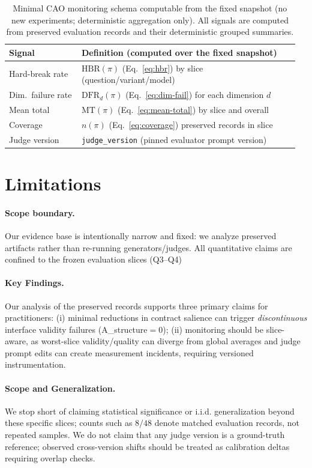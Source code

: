 \documentclass{article}
\newcommand{\Astruct}{A\_structure}
\begin{document}
\begin{table}[t]
\centering
\small
\begin{tabular}{@{}p{0.24\linewidth}p{0.72\linewidth}@{}}
\toprule
\textbf{Signal} & \textbf{Definition (computed over the fixed snapshot)}\\
\midrule
Hard-break rate & $\mathrm{HBR}(\pi)$ (Eq.~\ref{eq:hbr}) by slice (question/variant/model)\\
Dim.\ failure rate & $\mathrm{DFR}_{d}(\pi)$ (Eq.~\ref{eq:dim-fail}) for each dimension $d$\\
Mean total & $\mathrm{MT}(\pi)$ (Eq.~\ref{eq:mean-total}) by slice and overall\\
Coverage & $n(\pi)$ (Eq.~\ref{eq:coverage}) preserved records in slice\\
Judge version & \texttt{judge\_version} (pinned evaluator prompt version)\\
\bottomrule
\end{tabular}
\caption{Minimal CAO monitoring schema computable from the fixed snapshot (no new experiments; deterministic aggregation only). All signals are computed from preserved evaluation records and their deterministic grouped summaries.}
\label{tab:monitoring}
\end{table}

\section{Limitations}
\paragraph{Scope boundary.}
Our evidence base is intentionally narrow and fixed: we analyze preserved artifacts rather than re-running generators/judges.
All quantitative claims are confined to the frozen evaluation slices (Q3--Q4) 

\paragraph{Key Findings.} 
Our analysis of the preserved records supports three primary claims for practitioners:
(i) minimal reductions in contract salience can trigger \emph{discontinuous} interface validity failures (\Astruct$=0$);
(ii) monitoring should be slice-aware, as worst-slice validity/quality can diverge from global averages and judge prompt edits can create measurement incidents, requiring versioned instrumentation.

\paragraph{Scope and Generalization.} 
We stop short of claiming statistical significance or i.i.d. generalization beyond these specific slices; counts such as $8/48$ denote matched evaluation records, not repeated samples.
We do not claim that any judge version is a ground-truth reference; observed cross-version shifts should be treated as calibration deltas requiring overlap checks.
\end{document}

